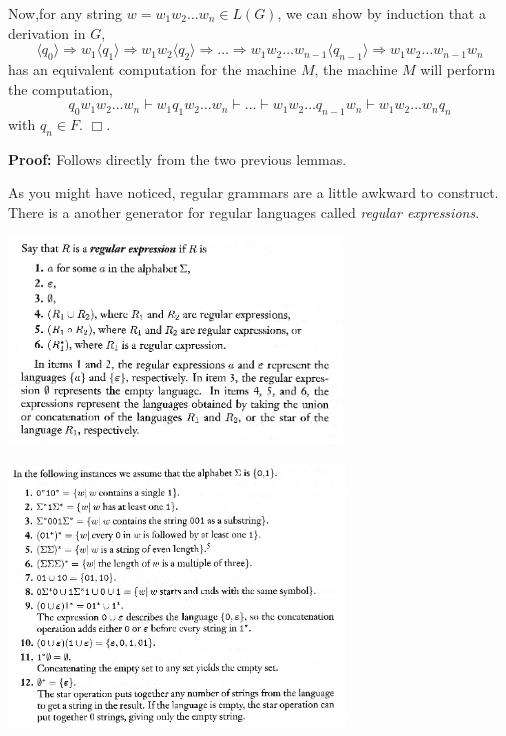 \documentclass[a4paper,blends,pdf,colorBG,slideColor]{prosper}
\begin{document}
\es


Now,for any string $w=w_1 w_2\ldots w_n\in L(G)$, we can show by induction that a derivation in $G$,
\[
\langle q_0\rangle \Rightarrow w_1\langle q_1\rangle \Rightarrow w_1 w_2\langle q_2 \rangle \Rightarrow \ldots 
\Rightarrow w_1 w_2 \ldots w_{n-1} \langle q_{n-1}\rangle \Rightarrow w_1 w_2 \ldots w_{n-1} w_n  
\]
has an equivalent computation for the machine $M$,
the machine $M$ will perform the computation,
\[
q_0 w_1 w_2 \ldots w_n \vdash  w_1 q_1 w_2 \ldots w_n \vdash  \ldots  \vdash 
 w_1 w_2 \ldots q_{n-1}w_n \vdash  w_1 w_2 \ldots w_n q_n
\]
with $q_n \in F$. 
$\Box$.
\es



{\bf Proof:} Follows directly from the two previous lemmas.
\es


As you might have noticed, regular grammars are a little awkward to construct.  There is a another
generator for regular languages called {\em regular expressions}.
\es

\begin{center}
\includegraphics[height=55mm]{images/reg-exp-def.eps}
\end{center}
\es

\begin{center}
\includegraphics[height=70mm]{images/reg-exp-example.eps}
\end{center}
\es
\end{document}
